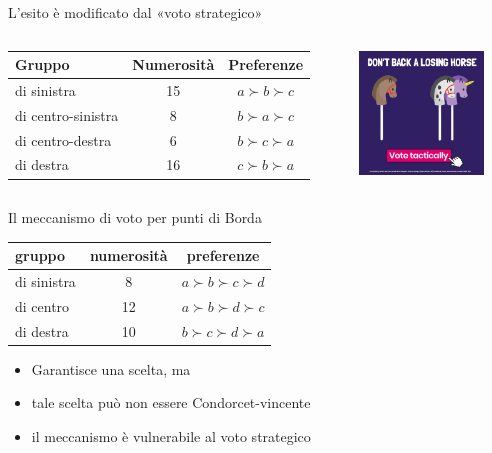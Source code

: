 \documentclass[11pt]{beamer}
\begin{document}
\begin{frame}{L'esito è modificato dal «voto strategico»}
\begin{columns}
\begin{column}{.7\columnwidth}
\begin{tabular}{lcc}\toprule
Gruppo & Numerosità &Preferenze\\
\midrule
di sinistra & 15 & $a \succ b \succ c$ \\
di centro-sinistra & 8 & $b \succ a \succ c$ \\
di centro-destra & 6 & $b \succ c \succ a$ \\
di destra & 16 & $c \succ b \succ a$ \\\bottomrule
\end{tabular}
\end{column}

\begin{column}{.3\columnwidth}
\begin{center}
\includegraphics[width=3.3cm]{./figure/vote-tactically.png}
\end{center}
\end{column}
\end{columns}
\end{frame}

\begin{frame}{Il meccanismo di voto per punti di Borda}
\begin{center}
\begin{tabular}{lcc}\toprule
  gruppo & numerosità &preferenze\\
  \midrule
  di sinistra & 8 & $a \succ b \succ c\succ d$ \\
  di centro & 12 & $a \succ b \succ d\succ c$ \\
  di destra & 10 & $b \succ c \succ d\succ a$ \\\bottomrule
\end{tabular}
\end{center}

\begin{itemize}
\item Garantisce una scelta, ma
\item tale scelta può non essere Condorcet-vincente
\item il meccanismo è vulnerabile al voto strategico
\end{itemize}
\end{frame}
\end{document}

